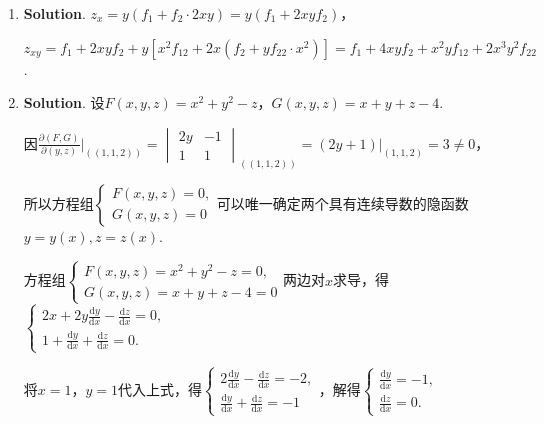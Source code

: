\documentclass[../Main.tex]{subfiles}
\begin{document}
\begin{enumerate}
    \item \textbf{Solution}. $z_{x} = y\left(f_{1}+f_{2}\cdot 2xy\right)=y\left(f
                  _{1}+2x y f_{2}\right)$，

          $z_{xy}= f_{1}+2xy f_{2} + y\left[x^{2}f_{12}+2x\left(f_{2}+yf_{22}\cdot x^{2}
                  \right)\right] = f_{1}+4xyf_{2} + x^{2}y f_{12}+ 2x^{3} y^{2} f_{22}$.

    \item \textbf{Solution}. 设$F(x,y,z) = x^{2}+y^{2}-z$，$G(x,y,z)=x+y+z-4$.

          因$\frac{\partial (F,G)}{\partial (y,z)}\bigg|_{\left((1,1,2)\right)}=
              \begin{vmatrix}
                  2y & -1 \\
                  1  & 1
              \end{vmatrix}_{\left((1,1,2)\right)}=\left.(2y+1)\right|_{\left(1,1,2\right)}
              =3\neq 0$，

          所以方程组$\begin{cases}
                  F(x,y,z)=0, \\
                  G(x,y,z)=0
              \end{cases}$可以唯一确定两个具有连续导数的隐函数$y=y(x),z=z(x)$.

          方程组$\begin{cases}
                  F(x,y,z) = x^{2}+y^{2}-z=0, \\
                  G(x,y,z)=x+y+z-4=0
              \end{cases}$两边对$x$求导，得 $\begin{cases}
                  2x+2y\frac{\mathrm{d}y}{\mathrm{d}x}-\frac{\mathrm{d}z}{\mathrm{d}x}=0, \\[6pt]
                  1+\frac{\mathrm{d}y}{\mathrm{d}x}+\frac{\mathrm{d}z}{\mathrm{d}x}=0.
              \end{cases}$

          将$x=1$，$y=1$代入上式，得$\begin{cases}
                  2\frac{\mathrm{d}y}{\mathrm{d}x}-\frac{\mathrm{d}z}{\mathrm{d}x}=-2, \\[6pt]
                  \frac{\mathrm{d}y}{\mathrm{d}x}+\frac{\mathrm{d}z}{\mathrm{d}x}=-1
              \end{cases}$，解得$\begin{cases}
                  \frac{\mathrm{d}y}{\mathrm{d}x}= -1, \\[6pt]
                  \frac{\mathrm{d}z}{\mathrm{d}x}= 0.
              \end{cases}$


\end{enumerate}
\end{document}
